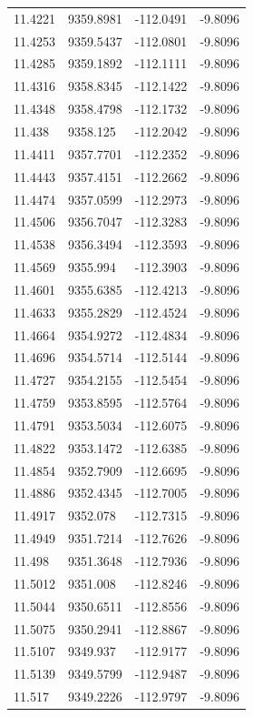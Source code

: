 \begin{table}[H]
\begin{tabular}{llll}
11.4221 & 9359.8981 & -112.0491 & -9.8096 \\
11.4253 & 9359.5437 & -112.0801 & -9.8096 \\
11.4285 & 9359.1892 & -112.1111 & -9.8096 \\
11.4316 & 9358.8345 & -112.1422 & -9.8096 \\
11.4348 & 9358.4798 & -112.1732 & -9.8096 \\
11.438 & 9358.125 & -112.2042 & -9.8096 \\
11.4411 & 9357.7701 & -112.2352 & -9.8096 \\
11.4443 & 9357.4151 & -112.2662 & -9.8096 \\
11.4474 & 9357.0599 & -112.2973 & -9.8096 \\
11.4506 & 9356.7047 & -112.3283 & -9.8096 \\
11.4538 & 9356.3494 & -112.3593 & -9.8096 \\
11.4569 & 9355.994 & -112.3903 & -9.8096 \\
11.4601 & 9355.6385 & -112.4213 & -9.8096 \\
11.4633 & 9355.2829 & -112.4524 & -9.8096 \\
11.4664 & 9354.9272 & -112.4834 & -9.8096 \\
11.4696 & 9354.5714 & -112.5144 & -9.8096 \\
11.4727 & 9354.2155 & -112.5454 & -9.8096 \\
11.4759 & 9353.8595 & -112.5764 & -9.8096 \\
11.4791 & 9353.5034 & -112.6075 & -9.8096 \\
11.4822 & 9353.1472 & -112.6385 & -9.8096 \\
11.4854 & 9352.7909 & -112.6695 & -9.8096 \\
11.4886 & 9352.4345 & -112.7005 & -9.8096 \\
11.4917 & 9352.078 & -112.7315 & -9.8096 \\
11.4949 & 9351.7214 & -112.7626 & -9.8096 \\
11.498 & 9351.3648 & -112.7936 & -9.8096 \\
11.5012 & 9351.008 & -112.8246 & -9.8096 \\
11.5044 & 9350.6511 & -112.8556 & -9.8096 \\
11.5075 & 9350.2941 & -112.8867 & -9.8096 \\
11.5107 & 9349.937 & -112.9177 & -9.8096 \\
11.5139 & 9349.5799 & -112.9487 & -9.8096 \\
11.517 & 9349.2226 & -112.9797 & -9.8096 \\

\end{tabular}
\end{table}
